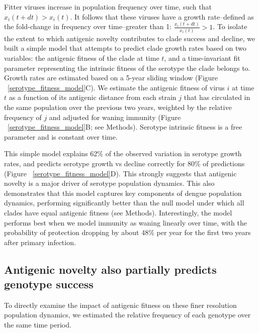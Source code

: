 \documentclass[11pt,oneside,letterpaper]{article}
\begin{document}
Fitter viruses increase in population frequency over time, such that $x_i(t+dt) > x_i(t)$.
It follows that these viruses have a growth rate--defined as the fold-change in frequency over time--greater than 1: $\frac{x_i(t+dt)}{x_i(t)} > 1$.
To isolate the extent to which antigenic novelty contributes to clade success and decline, we built a simple model that attempts to predict clade growth rates based on two variables: the antigenic fitness of the clade at time $t$, and a time-invariant fit parameter representing the intrinsic fitness of the serotype the clade belongs to.
Growth rates are estimated based on a 5-year sliding window (Figure ~\ref{serotype_fitness_model}C).
We estimate the antigenic fitness of virus $i$ at time $t$ as a function of its antigenic distance from each strain $j$ that has circulated in the same population over the previous two years, weighted by the relative frequency of $j$ and adjusted for waning immunity (Figure ~\ref{serotype_fitness_model}B; see Methods).
Serotype intrinsic fitness is a free parameter and is constant over time.

This simple model explains 62\% of the observed variation in serotype growth rates, and predicts serotype growth vs decline correctly for 80\% of predictions (Figure ~\ref{serotype_fitness_model}D).
This strongly suggests that antigenic novelty is a major driver of serotype population dynamics. %
This also demonstrates that this model captures key components of dengue population dynamics, performing significantly better than the null model under which all clades have equal antigenic fitness (see Methods).
Interestingly, the model performs best when we model immunity as waning linearly over time, with the probability of protection dropping by about 48\% per year for the first two years after primary infection.

\subsection{Antigenic novelty also partially predicts genotype success}
To directly examine the impact of antigenic fitness on these finer resolution population dynamics, we estimated the relative frequency of each genotype over the same time period.
\end{document}
